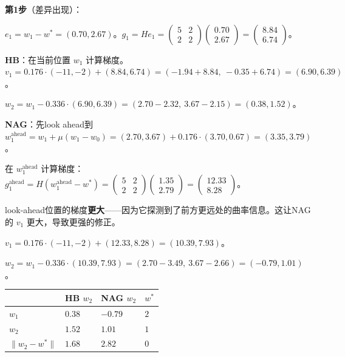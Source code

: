 \documentclass[12pt,a4paper]{article}
\begin{document}
\textbf{第1步}（差异出现）：

$e_1 = w_1 - w^* = (0.70, 2.67)$。$g_1 = He_1 = \begin{pmatrix}5&2\\2&2\end{pmatrix}\begin{pmatrix}0.70\\2.67\end{pmatrix} = \begin{pmatrix}8.84\\6.74\end{pmatrix}$。

\textbf{HB}：在当前位置 $w_1$ 计算梯度。$v_1 = 0.176 \cdot (-11,-2) + (8.84, 6.74) = (-1.94 + 8.84,\ -0.35 + 6.74) = (6.90, 6.39)$。

$w_2 = w_1 - 0.336 \cdot (6.90, 6.39) = (2.70 - 2.32,\ 3.67 - 2.15) = (0.38, 1.52)$。

\textbf{NAG}：先look ahead到 $w_1^{\text{ahead}} = w_1 + \mu(w_1 - w_0) = (2.70, 3.67) + 0.176 \cdot (3.70, 0.67) = (3.35, 3.79)$。

在 $w_1^{\text{ahead}}$ 计算梯度：$g_1^{\text{ahead}} = H(w_1^{\text{ahead}} - w^*) = \begin{pmatrix}5&2\\2&2\end{pmatrix}\begin{pmatrix}1.35\\2.79\end{pmatrix} = \begin{pmatrix}12.33\\8.28\end{pmatrix}$。

look-ahead位置的梯度\textbf{更大}——因为它探测到了前方更远处的曲率信息。这让NAG的 $v_1$ 更大，导致更强的修正。

$v_1 = 0.176 \cdot (-11,-2) + (12.33, 8.28) = (10.39, 7.93)$。

$w_2 = w_1 - 0.336 \cdot (10.39, 7.93) = (2.70 - 3.49,\ 3.67 - 2.66) = (-0.79, 1.01)$。






\begin{center}\small
\begin{longtable}{|l|l|l|l|}
\hline
 & HB $w_2$ & NAG $w_2$ & $w^*$ \\
\hline
$w_1$ & $0.38$ & $-0.79$ & $2$ \\
$w_2$ & $1.52$ & $1.01$ & $1$ \\
$\|w_2 - w^*\|$ & $1.68$ & $2.82$ & $0$ \\
\hline
\end{longtable}
\end{center}
\end{document}
